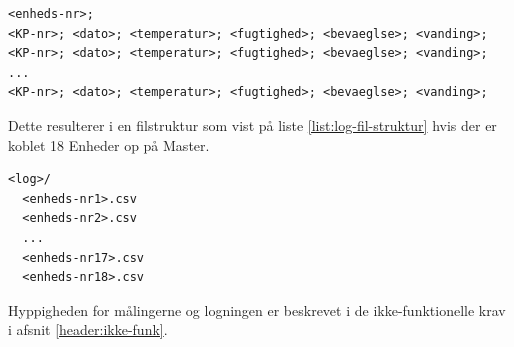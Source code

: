 \begin{lstlisting}[caption=Semikolon-separeret datafil til log af enheder, label={list:log-csv-struktur}]
<enheds-nr>;
<KP-nr>; <dato>; <temperatur>; <fugtighed>; <bevaeglse>; <vanding>;
<KP-nr>; <dato>; <temperatur>; <fugtighed>; <bevaeglse>; <vanding>;
...
<KP-nr>; <dato>; <temperatur>; <fugtighed>; <bevaeglse>; <vanding>;
\end{lstlisting}

Dette resulterer i en filstruktur som vist på liste \ref{list:log-fil-struktur} hvis der er koblet 18 Enheder op på Master.

\begin{lstlisting}[caption=Filstruktur for logfiler på Master, label={list:log-fil-struktur}]
<log>/
  <enheds-nr1>.csv
  <enheds-nr2>.csv
  ...
  <enheds-nr17>.csv
  <enheds-nr18>.csv
\end{lstlisting}

Hyppigheden for målingerne og logningen er beskrevet i de ikke-funktionelle krav i afsnit \ref{header:ikke-funk}.
